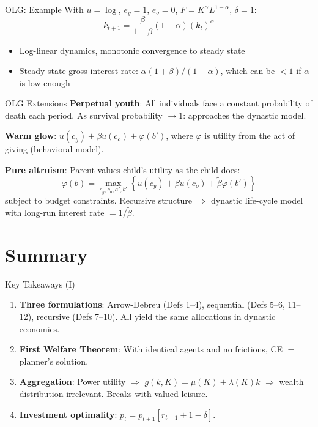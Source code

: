 \documentclass[blue]{beamer}
\begin{document}
\begin{frame}{OLG: Example}
	With $u = \log$, $e_y = 1$, $e_o = 0$, $F = K^{\alpha}L^{1-\alpha}$, $\delta = 1$:
	\[
	k_{t+1} = \frac{\beta}{1+\beta}(1-\alpha)(k_t)^{\alpha}
	\]
	
	\begin{itemize}
		\item Log-linear dynamics, monotonic convergence to steady state
		\item Steady-state gross interest rate: $\alpha(1+\beta)/(1-\alpha)$, which can be $< 1$ if $\alpha$ is low enough
	\end{itemize}
\end{frame}

\begin{frame}{OLG Extensions}
	\textbf{Perpetual youth}: All individuals face a constant probability of death each period. As survival probability $\to 1$: approaches the dynastic model.
	
	\bigskip
	\textbf{Warm glow}: $u(c_y) + \beta u(c_o) + \varphi(b')$, where $\varphi$ is utility from the act of giving (behavioral model).
	
	\bigskip
	\textbf{Pure altruism}: Parent values child's utility as the child does:
	\[
	\varphi(b) = \max_{c_y, c_o, a', b'} \left\{ u(c_y) + \beta u(c_o) + \tilde{\beta} \varphi(b') \right\}
	\]
	subject to budget constraints. Recursive structure $\Rightarrow$ dynastic life-cycle model with long-run interest rate $= 1/\tilde{\beta}$.
\end{frame}

\section{Summary}

\begin{frame}{Key Takeaways (I)}
	\begin{enumerate}
		\item \textbf{Three formulations}: Arrow-Debreu (Defs 1--4), sequential (Defs 5--6, 11--12), recursive (Defs 7--10). All yield the same allocations in dynastic economies.
		
		\item \textbf{First Welfare Theorem}: With identical agents and no frictions, CE $=$ planner's solution.
		
		\item \textbf{Aggregation}: Power utility $\Rightarrow$ $g(k,K) = \mu(K) + \lambda(K)k$ $\Rightarrow$ wealth distribution irrelevant. Breaks with valued leisure.
		
		\item \textbf{Investment optimality}: $p_t = p_{t+1}[r_{t+1} + 1-\delta]$.
	\end{enumerate}
\end{frame}
\end{document}
